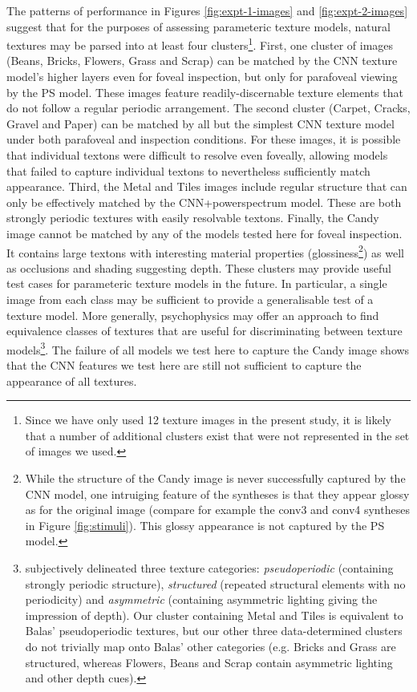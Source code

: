 \documentclass[doc, 11pt,a4paper,natbib]{apa6}\usepackage[]{graphicx}\usepackage[]{color}
\begin{document}
The patterns of performance in Figures \ref{fig:expt-1-images} and \ref{fig:expt-2-images} suggest that for the purposes of assessing parameteric texture models, natural textures may be parsed into at least four clusters\footnote{
Since we have only used 12 texture images in the present study, it is likely that a number of additional clusters exist that were not represented in the set of images we used.
}.
First, one cluster of images (Beans, Bricks, Flowers, Grass and Scrap) can be matched by the CNN texture model's higher layers even for foveal inspection, but only for parafoveal viewing by the PS model.
These images feature readily-discernable texture elements that do not follow a regular periodic arrangement.
The second cluster (Carpet, Cracks, Gravel and Paper) can be matched by all but the simplest CNN texture model under both parafoveal and inspection conditions.
For these images, it is possible that individual textons \citep[single texture elements;][]{julesz_textons_1981} were difficult to resolve even foveally, allowing models that failed to capture individual textons to nevertheless sufficiently match appearance.
Third, the Metal and Tiles images include regular structure that can only be effectively matched by the CNN+powerspectrum model.
These are both strongly periodic textures with easily resolvable textons.
Finally, the Candy image cannot be matched by any of the models tested here for foveal inspection.
It contains large textons with interesting material properties (glossiness\footnote{
While the structure of the Candy image is never successfully captured by the CNN model, one intruiging feature of the syntheses is that they appear glossy as for the original image (compare for example the conv3 and conv4 syntheses in Figure \ref{fig:stimuli}).
This glossy appearance is not captured by the PS model.
}) as well as occlusions and shading suggesting depth.
These clusters may provide useful test cases for parameteric texture models in the future.
In particular, a single image from each class may be sufficient to provide a generalisable test of a texture model.
More generally, psychophysics may offer an approach to find equivalence classes of textures that are useful for discriminating between texture models\footnote{
\citet{balas_texture_2006} subjectively delineated three texture categories: \textit{pseudoperiodic} (containing strongly periodic structure), \textit{structured} (repeated structural elements with no periodicity) and \textit{asymmetric} (containing asymmetric lighting giving the impression of depth).
Our cluster containing Metal and Tiles is equivalent to Balas' pseudoperiodic textures, but our other three data-determined clusters do not trivially map onto Balas' other categories (e.g. Bricks and Grass are structured, whereas Flowers, Beans and Scrap contain asymmetric lighting and other depth cues).}.
The failure of all models we test here to capture the Candy image shows that the CNN features we test here are still not sufficient to capture the appearance of all textures.
\end{document}
